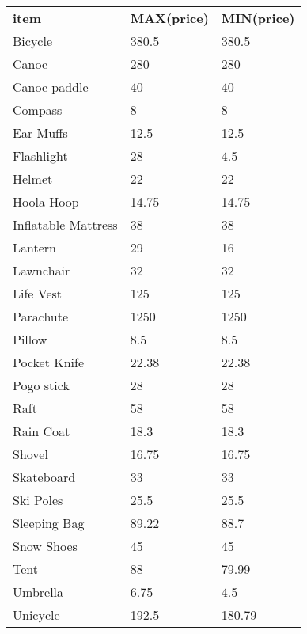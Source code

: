 \begin{tabular}{l l l}
    {\textbf{item}}       & {\textbf{MAX(price)}} & {\textbf{MIN(price)}} \\
    {Bicycle}             & {380.5}               & {380.5}               \\
    {Canoe}               & {280}                 & {280}                 \\
    {Canoe paddle}        & {40}                  & {40}                  \\
    {Compass}             & {8}                   & {8}                   \\
    {Ear Muffs}           & {12.5}                & {12.5}                \\
    {Flashlight}          & {28}                  & {4.5}                 \\
    {Helmet}              & {22}                  & {22}                  \\
    {Hoola Hoop}          & {14.75}               & {14.75}               \\
    {Inflatable Mattress} & {38}                  & {38}                  \\
    {Lantern}             & {29}                  & {16}                  \\
    {Lawnchair}           & {32}                  & {32}                  \\
    {Life Vest}           & {125}                 & {125}                 \\
    {Parachute}           & {1250}                & {1250}                \\
    {Pillow}              & {8.5}                 & {8.5}                 \\
    {Pocket Knife}        & {22.38}               & {22.38}               \\
    {Pogo stick}          & {28}                  & {28}                  \\
    {Raft}                & {58}                  & {58}                  \\
    {Rain Coat}           & {18.3}                & {18.3}                \\
    {Shovel}              & {16.75}               & {16.75}               \\
    {Skateboard}          & {33}                  & {33}                  \\
    {Ski Poles}           & {25.5}                & {25.5}                \\
    {Sleeping Bag}        & {89.22}               & {88.7}                \\
    {Snow Shoes}          & {45}                  & {45}                  \\
    {Tent}                & {88}                  & {79.99}               \\
    {Umbrella}            & {6.75}                & {4.5}                 \\
    {Unicycle}            & {192.5}               & {180.79}             
\end{tabular} \\ \\

